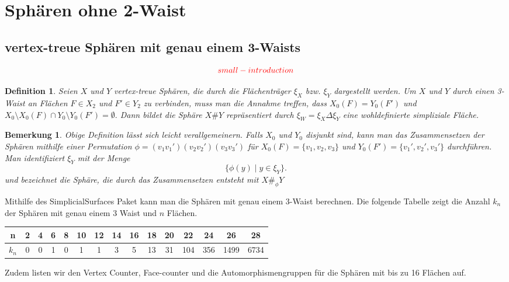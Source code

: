 \documentclass[12pt,titlepage,twoside,cleardoublepage]{article}
\theoremstyle{nummermitklammern}
\newtheorem{definition}[temp]{Definition}
\newtheorem{bemerkung}[temp]{Bemerkung}
\newtheorem{definition}[zahl]{Definition}
\newtheorem{bemerkung}[zahl]{Bemerkung}
\numberwithin{equation}{section}
\begin{document}
 \section{Sphären ohne 2-Waist}
\subsection{vertex-treue Sphären mit genau einem 3-Waists}
\[
\textcolor{red}{small-introduction}
\]
\begin{definition}
Seien $X$ und $Y$ vertex-treue Sphären, die durch die Flächenträger $\xi_X$ bzw. $\xi_Y$ dargestellt werden. Um $X$ und $Y$ durch einen 3-Waist an Flächen $F\in X_2$ und $F'\in Y_2$ zu verbinden, muss man die Annahme treffen, dass
$X_0(F)=Y_0(F')$ und $X_0\setminus X_0(F)\cap Y_0\setminus Y_0(F')=\emptyset.$ Dann bildet die Sphäre $X\#Y$ repräsentiert durch $\xi_W=\xi_X \Delta \xi_Y$ eine wohldefinierte simpliziale Fläche.
\end{definition}
\begin{bemerkung}
Obige Definition lässt sich leicht verallgemeinern. Falls $X_0$ und $Y_0$ disjunkt sind, kann man das Zusammensetzen der Sphären mithilfe einer Permutation $\phi=(v_1v_1')(v_2v_2')(v_3v_3')$ für $X_0(F)=\{v_1,v_2,v_3\}$ und $Y_0(F')=\{v_1',v_2',v_3'\}$ durchführen. Man identifiziert $\xi_Y$ mit der Menge  
\[
\{\phi (y)\mid y\in \xi_Y \}.
\]
und bezeichnet die Sphäre, die durch das Zusammensetzen  entsteht mit $X\#_{\phi}Y$
\end{bemerkung}
Mithilfe des SimplicialSurfaces Paket kann man die Sphären mit genau einem 3-Waist berechnen. Die folgende Tabelle zeigt die Anzahl $k_n$ der Sphären mit genau einem 3 Waist und $n$ Flächen. \\
\begin{tabular}[h]{|c|c|c|c|c|c|c|c|c|c|c|c|c|c|c|}
\hline
n&2& 4 &  6& 8 & 10 & 12 & 14&16&18&20&22&24&26&28\\
\hline
 $k_n$ &0 & 0 & 1 & 0 & 1 & 1 & 3 & 5 & 13 & 31 & 104 & 356 & 1499 & 6734  \\
 \hline
\end{tabular}

Zudem listen wir den Vertex Counter, Face-counter und die Automorphismengruppen für die Sphären mit bis zu 16 Flächen auf.
\end{document}
